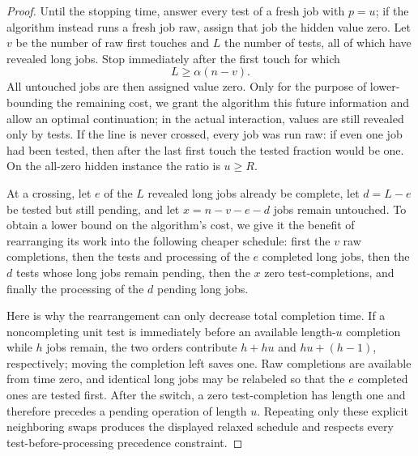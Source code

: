 \begin{proof}
Until the stopping time, answer every test of a fresh job with $p=u$; if the
algorithm instead runs a fresh job raw, assign that job the hidden value
zero.  Let $v$ be the number of raw first touches and $L$ the number of tests,
all of which have revealed long jobs.  Stop immediately after the first touch
for which
\begin{equation}
 L\ge\alpha(n-v).
 \label{eq:opt:stopping-line}
\end{equation}
All untouched jobs are then assigned value zero.  Only for the purpose of
lower-bounding the remaining cost, we grant the algorithm this future
information and allow an optimal continuation; in the actual interaction,
values are still revealed only by tests.  If the line is never crossed, every job
was run raw: if even one job had been tested, then after the last first touch
the tested fraction would be one.  On the all-zero hidden instance the ratio
is $u\ge R$.

At a crossing, let $e$ of the $L$ revealed long jobs already be complete,
let $d=L-e$ be tested but still pending, and let $x=n-v-e-d$ jobs remain
untouched.  To obtain a lower bound on the algorithm's cost, we give it the
benefit of rearranging its work into the following cheaper schedule: first
the $v$ raw completions, then the tests and processing of the $e$ completed
long jobs, then the $d$ tests whose long jobs remain pending, then the $x$
zero test-completions, and finally the processing of the $d$ pending long
jobs.

Here is why the rearrangement can only decrease total completion time.  If a
noncompleting unit test is immediately
before an available length-$u$ completion while $h$ jobs remain, the two
orders contribute $h+hu$ and $hu+(h-1)$, respectively; moving the
completion left saves one.  Raw completions are available from time zero,
and identical long jobs may be relabeled so that the $e$ completed ones are
tested first.  After the switch, a zero test-completion has length one and
therefore precedes a pending operation of length $u$.  Repeating only these
explicit neighboring swaps produces the displayed relaxed schedule and
respects every test-before-processing precedence constraint.


\end{proof}
